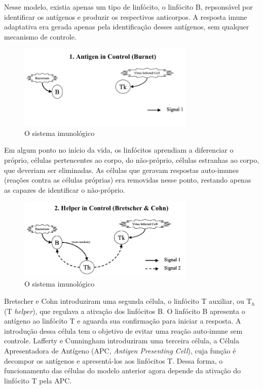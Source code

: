 \documentclass{iiufrgs}
\begin{document}
Nesse modelo, existia apenas um tipo de linfócito, o linfócito B, repsonsável por identificar os antígenos e produzir os respectivos anticorpos. A resposta imune adaptativa era gerada apenas pela identificação desses antígenos, sem qualquer mecanismo de controle.

\begin{figure}[h]
\centering
\includegraphics[width=0.75\textwidth]{img/signals1-antigen.png}
\caption{O sistema imunológico}
\end{figure}

Em algum ponto no início da vida, os linfócitos aprendiam a diferenciar o próprio, células pertencentes ao corpo, do não-próprio, células estranhas ao corpo, que deveriam ser eliminadas. As células que geravam respostas auto-imunes (reações contra as células próprias) era removidas nesse ponto, restando apenas as capazes de identificar o não-próprio.

\begin{figure}[h]
\centering
\includegraphics[width=0.75\textwidth]{img/signals2-helper.png}
\caption{O sistema imunológico}
\end{figure}

Bretscher e Cohn introduziram uma segunda célula, o linfócito T auxiliar, ou T$_{h}$ (T \emph{helper}), que regulava a ativação dos linfócitos B. O linfócito B apresenta o antígeno ao linfócito T e aguarda sua confirmação para iniciar a resposta. A introdução dessa célula tem o objetivo de evitar uma reação auto-imune sem controle. Lafferty e Cunningham introduziram uma terceira célula, a Célula Apresentadora de Antígeno (APC, \emph{Antigen Presenting Cell}), cuja função é decompor os antígenos e apresentá-los aos linfócitos T. Dessa forma, o funcionamento das células do modelo anterior agora depende da ativação do linfócito T pela APC.
\end{document}
